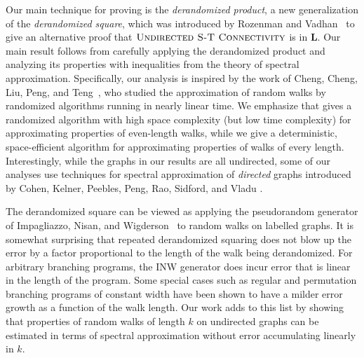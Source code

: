 \documentclass{toc}
\newcommand{\class}[1]{\mathbf{#1}}
\renewcommand{\L}{\class{L}}
\def\textprob#1{\textmd{\textsc{#1}}}
\newcommand{\USTConn}{\textprob{Undirected S-T Connectivity}}
\numberwithin{myalgctr}{section}
\theoremstyle{named}
\begin{document}
Our main technique for proving  is the \emph{derandomized product}, a new generalization of the \emph{derandomized square}, which was introduced by Rozenman and Vadhan~\cite{RozenmanVa05} to give an alternative proof that $\USTConn$ is in $\L$. Our main result follows from carefully applying the derandomized product and analyzing its properties with inequalities from the theory of spectral approximation. Specifically, our analysis is inspired by the work of Cheng, Cheng, Liu, Peng, and Teng~\cite{cheng2015}, who studied the approximation of random walks by randomized algorithms running in nearly linear time. We emphasize that
%
%
\cite{cheng2015} gives a randomized algorithm with high space complexity (but low time complexity) for approximating properties of even-length walks, while we give a deterministic, space-efficient algorithm for approximating properties of walks of every length. Interestingly, while the graphs in our results are all undirected, some of our analyses use techniques for spectral approximation of \emph{directed} graphs introduced by Cohen, Kelner, Peebles, Peng, Rao, Sidford, and Vladu \cite{CKPPSV16,CKPPRSV16}. 

The derandomized square can be viewed as applying the pseudorandom generator of Impagliazzo, Nisan, and Wigderson~\cite{ImpagliazzoNiWi94} to random walks on labelled graphs. It is somewhat surprising that repeated derandomized squaring does not blow up the error by a factor proportional to the length of the walk being derandomized. For arbitrary branching programs, the INW generator does incur error that is linear in the length of the program. Some special cases such as  regular \cite{BravermanRaRaYe10, BrodyVe10, De11} and permutation \cite{De11, Steinke12} branching programs of constant width have been shown to have a milder error growth as a function of the walk length. Our work adds to this list by showing that properties of random walks of length $k$ on undirected graphs can be estimated in terms of spectral approximation without error accumulating linearly in $k$.
\end{document}
